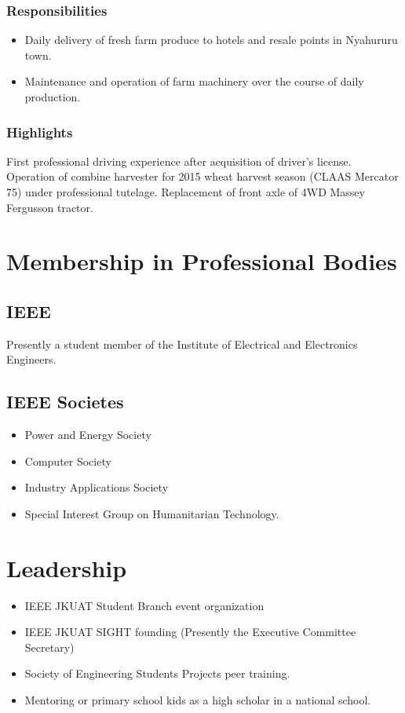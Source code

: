 \documentclass[a4paper]{article}
\begin{document}
\subsubsection{Responsibilities}
\begin{itemize}
	\item Daily delivery of fresh farm produce to hotels and resale points in Nyahururu town.
	\item Maintenance and operation of farm machinery over the course of daily production.
\end{itemize}
\subsubsection{Highlights}
First professional driving experience after acquisition of driver's license.
Operation of combine harvester for 2015 wheat harvest season (CLAAS Mercator 75) under professional tutelage.
Replacement of front axle of 4WD Massey Fergusson tractor.

\section{Membership in Professional Bodies}
\subsection{IEEE}
Presently a student member of the Institute of Electrical and Electronics Engineers.
\subsection{IEEE Societes}
\begin{itemize}
	\item Power and Energy Society
	\item Computer Society
	\item Industry Applications Society
	\item Special Interest Group on Humanitarian Technology.
\end{itemize}

\section{Leadership}
\begin{itemize}
	\item IEEE JKUAT Student Branch event organization
	\item IEEE JKUAT SIGHT founding (Presently the Executive Committee Secretary)
	\item Society of Engineering Students Projects peer training.
	\item Mentoring or primary school kids as a high scholar in a national school.
\end{itemize}
\end{document}
